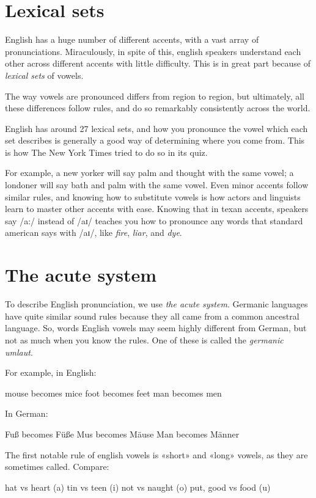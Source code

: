 \documentclass{article}
\begin{document}
\section{Lexical sets}

English has a huge number of different accents, with a vast array of
pronunciations. Miraculously, in spite of this, english speakers understand each
other across different accents with little difficulty. This is in great part
because of \textit{lexical sets} of vowels.

The way vowels are pronounced differs from region to region, but ultimately, all
these differences follow rules, and do so remarkably consistently across the
world.

English has around 27 lexical sets, and how you pronounce the vowel which each
set describes is generally a good way of determining where you come from. This
is how The New York Times tried to do so in its quiz.

For example, a new yorker will say palm and thought with the same vowel; a
londoner will say bath and palm with the same vowel. Even minor accents follow
similar rules, and knowing how to substitute vowels is how actors and linguists
learn to master other accents with ease. Knowing that in texan accents, speakers
say /a:/ instead of /aɪ/ teaches you how to pronounce any words that standard
american says with /aɪ/, like \textit{fire}, \textit{liar}, and \textit{dye}.

\section{The acute system}

To describe English pronunciation, we use \textit{the acute system}. Germanic
languages have quite similar sound rules because they all came from a common
ancestral language. So, words English vowels may seem highly different from
German, but not as much when you know the rules. One of these is called the
\textit{germanic umlaut}.

For example, in English:

mouse becomes mice
foot becomes feet
man becomes men

In German:

Fuß becomes Füße
Mus becomes Mäuse
Man becomes Männer

The first notable rule of english vowels is «short» and «long» vowels, as they
are sometimes called. Compare:

hat vs heart (a)
tin vs teen (i)
not vs naught (o)
put, good vs food (u)
\end{document}
